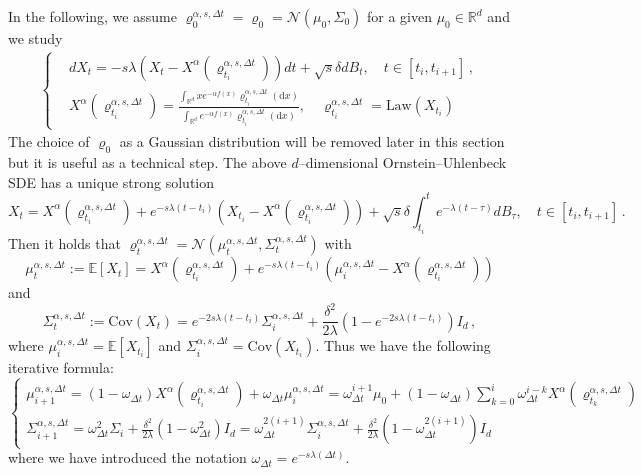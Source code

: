 \documentclass[reqno]{amsart}
\numberwithin{algorithm}{section}
\newcommand{\diff}{\mathrm{d}}
\newcommand{\R}{\mathbb{R}}
\newcommand{\RR}{\mathbb{R}}
\newcommand{\EE}{{\mathbb E}}
\newcommand{\Xalpha}{{X^\alpha}}
\newcommand{\mc}[1]{\mathcal{#1}}
\begin{document}
{%
In the following, we assume $\varrho^{\alpha,s,\Delta t}_0 = \varrho_0=\mc{N}(\mu_0,\Sigma_0)$ for a given $\mu_0\in\R^d$ and we study 
\begin{align}\label{CBO}
\begin{cases}
     &dX_t=-s\lambda (X_t-\Xalpha(\varrho^{\alpha,s,\Delta t}_{t_i}))dt+\sqrt{s}\delta dB_t,\quad  t\in [t_i,t_{i+1}]\,,\\
     &\Xalpha(\varrho^{\alpha,s,\Delta t}_{t_i})=\displaystyle\frac{\int_{\RR^d} x e^{-\alpha f(x)}\varrho^{\alpha,s,\Delta t}_{t_i}(\diff x)}{\int_{\RR^d}e^{-\alpha f(x)}\varrho^{\alpha,s,\Delta t}_{t_i}(\diff x)},\quad \varrho^{\alpha,s,\Delta t}_{t_i}=\mbox{Law}(X_{t_i})
\end{cases}
\end{align}
The choice of $\varrho_0$ as a Gaussian distribution will be removed later in this section but it is useful as a technical step.
The above $d$–dimensional Ornstein–Uhlenbeck SDE has a unique strong solution
\begin{equation}
    X_t=\Xalpha(\varrho^{\alpha,s,\Delta t}_{t_i})+e^{-s\lambda(t-t_i)}(X_{t_i}-\Xalpha(\varrho^{\alpha,s,\Delta t}_{t_i}))+\sqrt{s}\delta \int_{t_i}^t e^{-\lambda(t-\tau)}dB_\tau,\quad t\in [t_i,t_{i+1}]\,.
\end{equation}
Then it holds that $\varrho^{\alpha,s,\Delta t}_t=\mc{N}(\mu^{\alpha,s,\Delta t}_t,\Sigma^{\alpha,s,\Delta t}_t)$ with 
\begin{equation}\label{eq:mu_t}
    \mu^{\alpha,s,\Delta t}_t:=\EE[X_t]=\Xalpha(\varrho^{\alpha,s,\Delta t}_{t_i})+e^{-s\lambda(t-t_i)}(\mu^{\alpha,s,\Delta t}_i-\Xalpha(\varrho^{\alpha,s,\Delta t}_{t_i}))
\end{equation}
and 
\begin{equation}
    \Sigma_t^{\alpha,s,\Delta t}:=\mbox{Cov}(X_t)=e^{-2s\lambda(t-t_i)}\Sigma^{\alpha,s,\Delta t}_i+\frac{\delta^2}{2\lambda}(1-e^{-2s\lambda(t-t_i)})I_d\,,
\end{equation}
where $\mu^{\alpha,s,\Delta t}_i=\EE[X_{t_i}]$ and $\Sigma^{\alpha,s,\Delta t}_i=\mbox{Cov}(X_{t_i})$. Thus we have the following iterative formula:
\begin{equation}\label{iterative'}
    \begin{cases}
        \mu^{\alpha,s,\Delta t}_{i+1}=(1-\omega_{\Delta t})\Xalpha(\varrho^{\alpha,s,\Delta t}_{t_i})+\omega_{\Delta t}\mu^{\alpha,s,\Delta t}_i=\omega_{\Delta t}^{i+1}\mu_0+(1-\omega_{\Delta t})\sum_{k=0}^{i}\omega_{\Delta t}^{i-k}\Xalpha(\varrho^{\alpha,s,\Delta t}_{t_k}) \\
        \Sigma_{i+1}^{\alpha,s,\Delta t}=\omega_{\Delta t}^2\Sigma_i+\frac{\delta^2}{2\lambda}(1-\omega_{\Delta t}^2)I_d=\omega_{\Delta t}^{2(i+1)}\Sigma_i^{\alpha,s,\Delta t}+\frac{\delta^2}{2\lambda}(1-\omega_{\Delta t}^{2(i+1)})I_d
    \end{cases}
\end{equation}
where we have introduced the notation $\omega_{\Delta t}=e^{-s\lambda(\Delta t)}$. 

}
\end{document}
